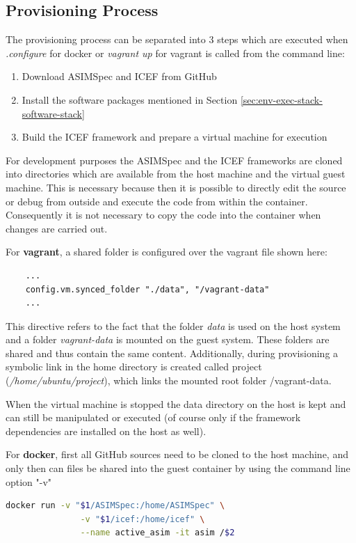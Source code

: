 \subsection{Provisioning Process}

The provisioning process can be separated into 3 steps which are executed when \textit{.\/configure} for docker or \textit{vagrant up} for vagrant is called from the command line:

\begin{enumerate}
	\item Download ASIMSpec and ICEF from GitHub
	\item Install the software packages mentioned in Section \ref{sec:env-exec-stack-software-stack}
	\item Build the ICEF framework and prepare a virtual machine for execution
\end{enumerate}

For development purposes the ASIMSpec and the ICEF frameworks are cloned into directories which are available from the host machine and the virtual guest machine. This is necessary because then it is possible to directly edit the source or debug from outside and execute the code from within the container. Consequently it is not necessary to copy the code into the container when changes are carried out.

For \textbf{vagrant}, a shared folder is configured over the vagrant file shown here:
\begin{lstlisting}
	...
	config.vm.synced_folder "./data", "/vagrant-data"
	...
\end{lstlisting}
This directive refers to the fact that the folder \textit{data} is used on the host system and a folder \textit{vagrant-data} is mounted on the guest system. These folders are shared and thus contain the same content. Additionally, during provisioning a symbolic link in the home directory is created called project (\textit{/home/ubuntu/project}), which links the mounted root folder /vagrant-data.

When the virtual machine is stopped the data directory on the host is kept and can still be manipulated or executed (of course only if the framework dependencies are installed on the host as well).

For \textbf{docker}, first all GitHub sources need to be cloned to the host machine, and only then can files be shared into the guest container by using the command line option "-v"
\begin{lstlisting}[language=bash]
	docker run -v "$1/ASIMSpec:/home/ASIMSpec" \
	           -v "$1/icef:/home/icef" \
	           --name active_asim -it asim /$2
\end{lstlisting}

